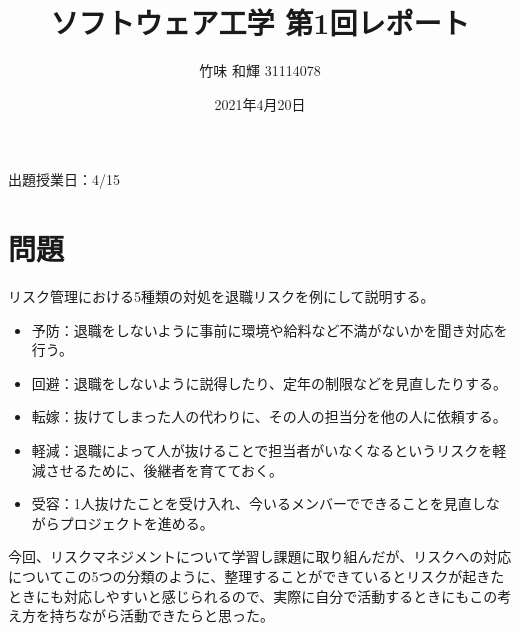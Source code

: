 \documentclass[12pt]{jsarticle}
\title{ソフトウェア工学 第1回レポート}
\author{竹味 和輝 31114078}
\date{2021年4月20日}
\begin{document}
\maketitle

出題授業日：4/15
\section{問題}
リスク管理における5種類の対処を退職リスクを例にして説明する。
　
\begin{itemize}
  \item 予防：退職をしないように事前に環境や給料など不満がないかを聞き対応を行う。
  \item 回避：退職をしないように説得したり、定年の制限などを見直したりする。
  \item 転嫁：抜けてしまった人の代わりに、その人の担当分を他の人に依頼する。
  \item 軽減：退職によって人が抜けることで担当者がいなくなるというリスクを軽減させるために、後継者を育てておく。
  \item 受容：1人抜けたことを受け入れ、今いるメンバーでできることを見直しながらプロジェクトを進める。
\end{itemize}  

今回、リスクマネジメントについて学習し課題に取り組んだが、リスクへの対応についてこの5つの分類のように、整理することができているとリスクが起きたときにも対応しやすいと感じられるので、実際に自分で活動するときにもこの考え方を持ちながら活動できたらと思った。
　
\end{document}
